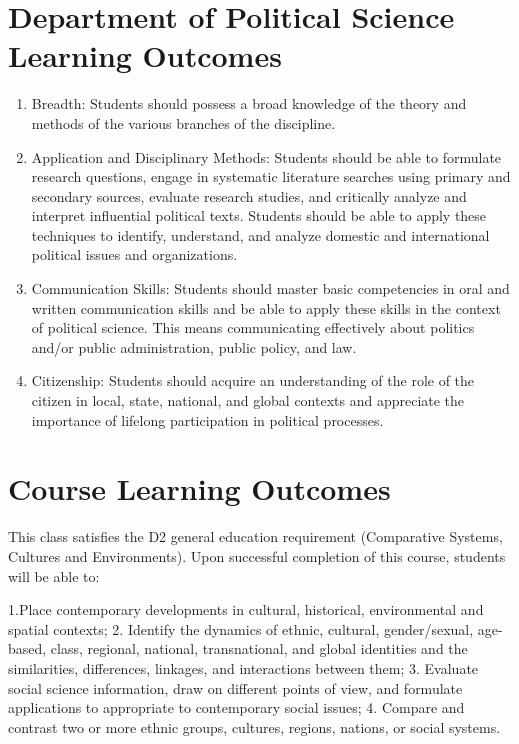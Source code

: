 \documentclass[11pt,]{article}
\providecommand{\tightlist}{%
  \setlength{\itemsep}{0pt}\setlength{\parskip}{0pt}}
\begin{document}
\hypertarget{department-of-political-science-learning-outcomes}{%
\section{Department of Political Science Learning
Outcomes}\label{department-of-political-science-learning-outcomes}}

\begin{enumerate}
\def\labelenumi{\arabic{enumi}.}
\tightlist
\item
  Breadth: Students should possess a broad knowledge of the theory and
  methods of the various branches of the discipline.
\item
  Application and Disciplinary Methods: Students should be able to
  formulate research questions, engage in systematic literature searches
  using primary and secondary sources, evaluate research studies, and
  critically analyze and interpret influential political texts. Students
  should be able to apply these techniques to identify, understand, and
  analyze domestic and international political issues and organizations.
\item
  Communication Skills: Students should master basic competencies in
  oral and written communication skills and be able to apply these
  skills in the context of political science. This means communicating
  effectively about politics and/or public administration, public
  policy, and law.
\item
  Citizenship: Students should acquire an understanding of the role of
  the citizen in local, state, national, and global contexts and
  appreciate the importance of lifelong participation in political
  processes.
\end{enumerate}

\hypertarget{course-learning-outcomes}{%
\section{Course Learning Outcomes}\label{course-learning-outcomes}}

This class satisfies the D2 general education requirement (Comparative
Systems, Cultures and Environments). Upon successful completion of this
course, students will be able to:

1.Place contemporary developments in cultural, historical, environmental
and spatial contexts; 2. Identify the dynamics of ethnic, cultural,
gender/sexual, age-based, class, regional, national, transnational, and
global identities and the similarities, differences, linkages, and
interactions between them; 3. Evaluate social science information, draw
on different points of view, and formulate applications to appropriate
to contemporary social issues; 4. Compare and contrast two or more
ethnic groups, cultures, regions, nations, or social systems.
\end{document}
